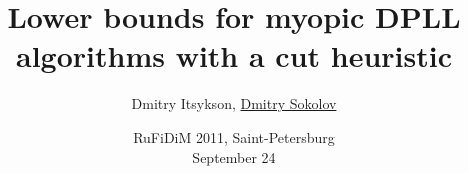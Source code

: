 

\title[\insertframenumber/\inserttotalframenumber~|~
Lower bounds for DPLL algorthms]{Lower bounds for myopic DPLL
  algorithms with a cut heuristic}
\author[Sokolov D.O]{Dmitry Itsykson, \underline{Dmitry Sokolov}}

\date{RuFiDiM 2011, Saint-Petersburg \\
	September 24}



	\maketitle

	



